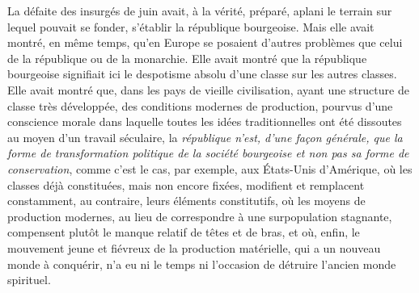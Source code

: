 \documentclass[french,twoside]{book} %
\begin{document}
La défaite des insurgés de juin avait, à la vérité, préparé, aplani le terrain sur lequel pouvait se fonder, s’établir la république bourgeoise. Mais elle avait montré, en même temps, qu’en Europe se posaient d’autres problèmes que celui de la république ou de la monarchie. Elle avait montré que la république bourgeoise signifiait ici le despotisme absolu d’une classe sur les autres classes. Elle avait montré que, dans les pays de vieille civilisation, ayant une structure de classe très développée, des conditions modernes de production, pourvus d’une conscience morale dans laquelle toutes les idées traditionnelles ont été dissoutes au moyen d’un travail séculaire, la \emph{république n’est, d’une façon générale, que la forme de transformation politique de la société bourgeoise et non pas sa forme de conservation}, comme c’est le cas, par exemple, aux États-Unis d’Amérique, où les classes déjà constituées, mais non encore fixées, modifient et remplacent constamment, au contraire, leurs éléments constitutifs, où les moyens de production modernes, au lieu de correspondre à une surpopulation stagnante, compensent plutôt le manque relatif de têtes et de bras, et où, enfin, le mouvement jeune et fiévreux de la production matérielle, qui a un nouveau monde à conquérir, n’a eu ni le temps ni l’occasion de détruire l’ancien monde spirituel.\par
\end{document}
